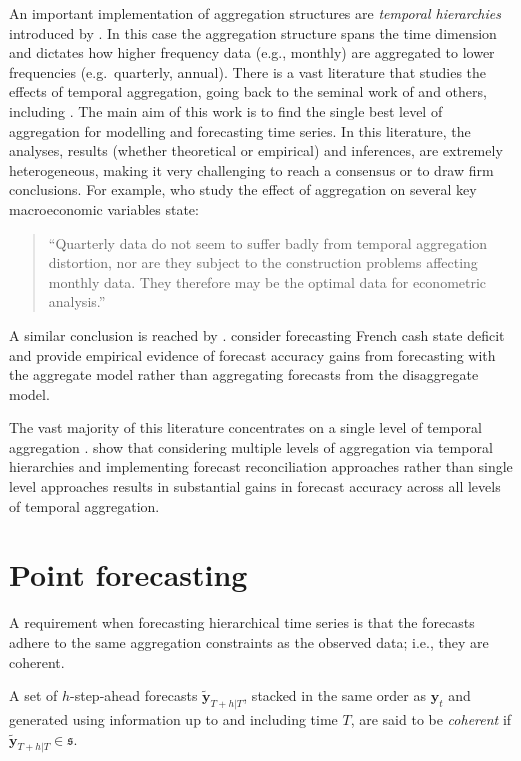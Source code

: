 {An important implementation of aggregation structures are \textit{temporal hierarchies} introduced by \citet{AthEtAl2017}. In this case the aggregation structure spans the time dimension and dictates how higher frequency data (e.g., monthly) are aggregated to lower frequencies (e.g.\ quarterly, annual). There is a vast literature that studies the effects of temporal aggregation, going back to the seminal work of \citet{ZelMon1971, AmeWu1972, Tia1972, Bre1973} and others, including \citet{Hot1993, HotCar1993, Mar1999, SilEtAl2008}. The main aim of this work is to find the single best level of aggregation for modelling and forecasting time series. In this literature, the analyses, results (whether theoretical or empirical) and inferences, are extremely heterogeneous, making it very challenging to reach a consensus or to draw firm conclusions. For example, \citet{RosSea1995} who study the effect of aggregation on several key macroeconomic variables state:
\begin{quote}
``Quarterly data do not seem to suffer badly from temporal aggregation distortion, nor are they subject to the construction problems affecting monthly data. They therefore may be the optimal data for econometric analysis.''
\end{quote}
A similar conclusion is reached by \citet{NijPal1990}. \citet{SilEtAl2008} consider forecasting French cash state deficit and provide empirical evidence of forecast accuracy gains from forecasting with the aggregate model rather than aggregating forecasts from the disaggregate model.

The vast majority of this literature concentrates on a single level of temporal aggregation \citep[although there are some notable exceptions such as][]{AndEtAl2011,KouEtAl2014}. \citet{AthEtAl2017} show that considering multiple levels of aggregation via temporal hierarchies and implementing forecast reconciliation approaches rather than single level approaches results in substantial gains in forecast accuracy across all levels of temporal aggregation.

\section{Point forecasting}\label{sec:point forecasting}

A requirement when forecasting hierarchical time series is that the forecasts adhere to the same aggregation constraints as the observed data; i.e., they are coherent.

\begin{definition}\label{def:coherence}
	A set of $h$-step-ahead forecasts $\tilde{\bm{y}}_{T+h|T}$, stacked in the same order as $\bm{y}_{t}$ and generated using information up to and including time $T$, are said to be \textit{coherent} if $\tilde{\bm{y}}_{T+h|T} \in \mathfrak{s}$.
\end{definition}

}
